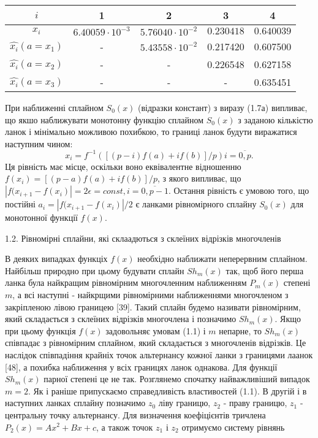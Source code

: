 \documentclass[ukrainian,14pt]{extarticle}
\begin{document}
\bgroup
\def\arraystretch{1.5}
\begin{center}
\begin{tabular}{ c | c |
c | c | c }
 $i$ & 1 & 2 & 3 & 4 \\
 \hline
 $x_i$ & $6.40059 \cdot 10^{-3}$ & $5.76040 \cdot 10^{-2}$ & $0.230418$ & $0.640039$ \\  
 \hline
  $\hat{x_i} (a = x_1)$ & - & $5.43558 \cdot 10^{-2}$ & 0.217420 & 0.607500 \\  
 \hline
 $\hat{x_i} (a = x_2)$ & - & - & 0.226548 & 0.627158   \\
 \hline
   $\hat{x_i} (a = x_3)$ & - & - & - & 0.635451 \\  
\end{tabular}
\end{center}
\egroup

При наближенні сплайном $S_0(x)$ (відразки констант) з виразу (1.7а) випливає, що якшо наближувати монотонну функцію сплайном $S_0(x)$ з заданою кількістю ланок і мінімально можливою похибкою, то границі ланок будути виражатися наступним чином:
$$x_i = f^{-1}([(p - i)f(a) + if(b)] / p) i = \overline{0, p}.$$
Ця рівність має місце, оскільки воно еквівалентне відношенню $f(x_i) = [(p-a)f(a) + if(b)]/p$, з якого випливає, що $|f(x_{i+1} - f(x_i)| = 2\epsilon = const, i = \overline{0, p-1}$. Остання рівність є умовою того, що постійні $a_i = |f(x_{i+1}- f(x_i)| / 2$ є ланками рівномірного сплайну $S_0(x)$ для монотонної функції $f(x)$.

1.2. Рівномірні сплайни, які склаадються з склеїних відрізків многочленів

В деяких випадках функціх $f(x)$ необхідно наближати неперервним сплайном. Найбільш природно при цьому будувати сплайн $S h_m(x)$ так, щоб його перша ланка була найкращим рівномірним многочленним наближенням $P_m(x)$ степені $m$, а всі наступні - найкрщими рівномірними наближеннями многочленом з закріпленою лівою границею [39]. Такий сплайн будемо називати рівномірним, який складається з склеїних відрізків многочлена і позначимо $S h_m(x)$. Якщо при цьому функція $f(x)$ задовольняє умовам (1.1) і $m$ непарне, то $S h_m(x)$ співпадає з рівномірним сплайном, який складається з многочленів відрізків. Це наслідок співпадіння крайніх точок альтернансу кожної ланки з границями лаанок [48], а похибка наближення у всіх границях ланок однакова. Для функції $S h_m(x)$ парної степені це не так. Розглянемо спочатку найважливіший випадок $m = 2$. Як і раніше припускаємо справедливість властивостей (1.1).  В другій і в наступних ланках сплайну позначимо $z_0$ ліву границю, $z_2$ - праву границю, $z_1$ - центральну точку альтернансу. Для визначення коефіцієнтів тричлена $P_2(x) = Ax^2 + Bx + c$, а також точок $z_1$ і $z_2$ отримуємо систему рівнянь
\end{document}
